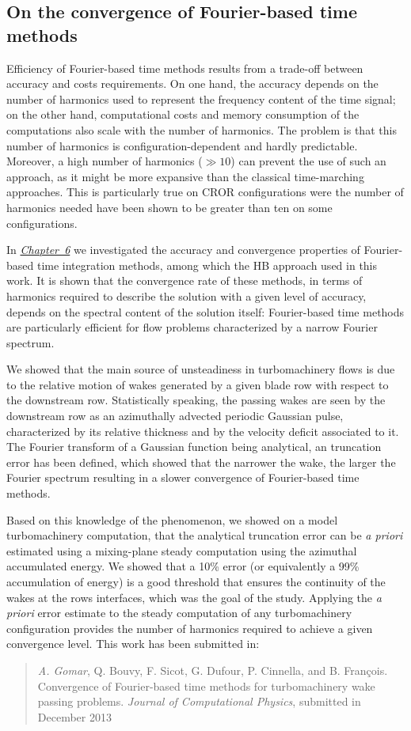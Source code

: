 \subsection*{On the convergence of Fourier-based time methods}

Efficiency of Fourier-based time methods results 
from a trade-off between accuracy and 
costs requirements.
On one hand, the accuracy depends on the number of harmonics
used to represent the frequency content of the time 
signal; on the other hand, computational costs and 
memory consumption of the computations also scale
with the number of harmonics. 
The problem is that this number of harmonics is 
configuration-dependent and hardly predictable. 
Moreover, a high number of harmonics
($\gg 10$) can prevent the use of such an approach,
as it might be more expansive than the classical time-marching approaches.
This is particularly true on CROR configurations were the number
of harmonics needed have been shown to be greater than ten
on some configurations.

In \hyperref[cha:limitations_convergence]{\emph{Chapter~6}}
we investigated the accuracy and convergence properties 
of Fourier-based time integration methods, among which the
HB approach used in this work. It is shown that the convergence rate 
of these methods, in terms of harmonics required to describe the solution 
with a given level of accuracy, depends on the spectral content of the 
solution itself: Fourier-based time methods are particularly efficient 
for flow problems characterized by a narrow Fourier 
spectrum. 

We showed that the main source of unsteadiness in 
turbomachinery flows is due to the relative motion of wakes 
generated by a given blade row with respect to the downstream row.
Statistically speaking, the passing wakes are seen by the downstream 
row as an azimuthally advected periodic Gaussian pulse, 
characterized by its relative thickness
and by the velocity deficit associated to it.
The Fourier transform of a Gaussian function being analytical,
an truncation error has been defined, which showed that the narrower the wake, 
the larger the Fourier spectrum resulting in a slower convergence 
of Fourier-based time methods.

Based on this knowledge of the phenomenon,
we showed on a model turbomachinery computation, that
the analytical truncation error can be \emph{a priori} 
estimated using a mixing-plane steady computation
using the azimuthal accumulated energy.
We showed that a 10\% error (or equivalently 
a 99\% accumulation of energy) is a good threshold
that ensures the continuity of the wakes at the rows
interfaces, which was the goal of the study.
Applying the \emph{a priori} error estimate to 
the steady computation of any turbomachinery configuration
provides the number of harmonics required 
to achieve a given convergence level.
This work has been submitted in:
\begin{quote}
	{\small \emph{A. Gomar}, Q. Bouvy, F. Sicot, G. Dufour, P. Cinnella, and B. Fran\c cois. Convergence of Fourier-based time methods for turbomachinery wake passing problems. 
	\emph{Journal of Computational Physics}, submitted in December 2013}
\end{quote}

